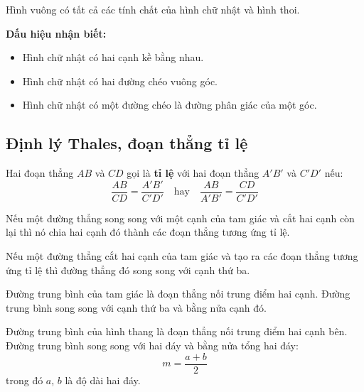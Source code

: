 \documentclass[12pt,a4paper]{article}
\begin{document}
\begin{tinhchat}
  Hình vuông có tất cả các tính chất của hình chữ nhật và hình thoi.
\end{tinhchat}

\medskip\noindent\textbf{Dấu hiệu nhận biết:}
\begin{itemize}
  \item Hình chữ nhật có hai cạnh kề bằng nhau.
  \item Hình chữ nhật có hai đường chéo vuông góc.
  \item Hình chữ nhật có một đường chéo là đường phân giác của một góc.
\end{itemize}

\subsection{Định lý Thales, đoạn thẳng tỉ lệ}

\begin{dinhnghia}
  Hai đoạn thẳng $AB$ và $CD$ gọi là \textbf{tỉ lệ} với hai đoạn thẳng $A'B'$ và $C'D'$ nếu:
  \[
    \frac{AB}{CD} = \frac{A'B'}{C'D'} \quad\text{hay}\quad \frac{AB}{A'B'} = \frac{CD}{C'D'}
  \]
\end{dinhnghia}

\begin{dinhly}[title={Định lý Thales}]
  Nếu một đường thẳng song song với một cạnh của tam giác và cắt hai cạnh còn lại thì nó chia hai cạnh đó thành các đoạn thẳng tương ứng tỉ lệ.
\end{dinhly}

\begin{dinhly}[title={Định lý Thales đảo}]
  Nếu một đường thẳng cắt hai cạnh của tam giác và tạo ra các đoạn thẳng tương ứng tỉ lệ thì đường thẳng đó song song với cạnh thứ ba.
\end{dinhly}

\begin{tinhchat}[title={Đường trung bình của tam giác}]
  Đường trung bình của tam giác là đoạn thẳng nối trung điểm hai cạnh. Đường trung bình song song với cạnh thứ ba và bằng nửa cạnh đó.
\end{tinhchat}

\begin{tinhchat}[title={Đường trung bình của hình thang}]
  Đường trung bình của hình thang là đoạn thẳng nối trung điểm hai cạnh bên. Đường trung bình song song với hai đáy và bằng nửa tổng hai đáy:
  \[
    m = \frac{a + b}{2}
  \]
  trong đó $a$, $b$ là độ dài hai đáy.
\end{tinhchat}
\end{document}
